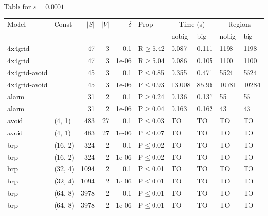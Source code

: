 \small Table for \(\varepsilon=0.0001\)
\begin{longtable}{llrrrlllll}

        \toprule
        Model & Const & $|S|$ & $|V|$ & $\delta$ & Prop & \multicolumn{2}{c}{Time (s)} & \multicolumn{2}{c}{Regions} \\
        \cmidrule(ll){7-8} \cmidrule(ll){9-10}
        & & & & & & nobig & big & nobig & big \\
        \midrule
        
 4x4grid       &           &     	47 &   3 & 0.1   & R$\geq$6.42  & 0.087    & 0.111    & 1198   & 1198   \\
 4x4grid       &           &     	47 &   3 & 1e-06 & R$\geq$5.04  & 0.086    & 0.105    & 1100   & 1100   \\
 4x4grid-avoid &           &     	45 &   3 & 0.1   & P$\leq$0.85  & 0.355    & 0.471    & 5524   & 5524   \\
 4x4grid-avoid &           &     	45 &   3 & 1e-06 & P$\leq$0.93  & 13.008   & 85.96    & 10781  & 10284  \\
 alarm         &           &     	31 &   2 & 0.1   & P$\geq$0.24  & 0.136    & 0.137    & 55     & 55     \\
 alarm         &           &     	31 &   2 & 1e-06 & P$\geq$0.04  & 0.163    & 0.162    & 43     & 43     \\
 avoid         & (4, 1)    &    	483 &  27 & 0.1   & P$\leq$0.03  & TO       & TO       & TO     & TO     \\
 avoid         & (4, 1)    &    	483 &  27 & 1e-06 & P$\leq$0.07  & TO       & TO       & TO     & TO     \\
 brp           & (16, 2)   &    	324 &   2 & 0.1   & P$\leq$0.02  & TO       & TO       & TO     & TO     \\
 brp           & (16, 2)   &    	324 &   2 & 1e-06 & P$\leq$0.02  & TO       & TO       & TO     & TO     \\
 brp           & (32, 4)   &   	1094 &   2 & 0.1   & P$\leq$0.01  & TO       & TO       & TO     & TO     \\
 brp           & (32, 4)   &   	1094 &   2 & 1e-06 & P$\leq$0.01  & TO       & TO       & TO     & TO     \\
 brp           & (64, 8)   &   	3978 &   2 & 0.1   & P$\leq$0.01  & TO       & TO       & TO     & TO     \\
 brp           & (64, 8)   &   	3978 &   2 & 1e-06 & P$\leq$0.01  & TO       & TO       & TO     & TO     \\

\end{longtable}
